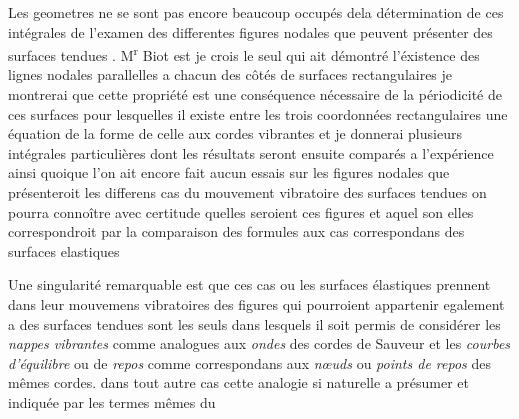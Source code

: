 \documentclass[11pt,a4paper]{article}
\begin{document}
Les geometres ne se sont pas encore beaucoup occupés dela détermination
de ces intégrales   de l'examen des differentes figures
nodales que peuvent présenter  des surfaces tendues . M\textsuperscript{r} Biot est je crois le seul qui ait démontré
l'éxistence des lignes nodales parallelles a chacun des côtés de  
surfaces rectangulaires 
je montrerai que cette propriété est une conséquence nécessaire de la
périodicité de ces surfaces pour lesquelles il existe entre les trois coordonnées
rectangulaires une équation de la forme de celle aux cordes vibrantes
et je donnerai plusieurs intégrales particulières dont les résultats
seront ensuite comparés a l'expérience  ainsi
quoique l'on ait encore fait aucun essais sur les figures nodales
que présenteroit les differens cas du mouvement vibratoire des
surfaces tendues on pourra connoître avec certitude quelles seroient
ces figures et aquel son elles correspondroit par la comparaison
des formules aux cas correspondans des surfaces elastiques

Une singularité remarquable est que ces cas ou les surfaces élastiques
prennent dans leur mouvemens vibratoires des figures qui 
pourroient appartenir egalement a des surfaces tendues sont les seuls
dans lesquels il soit permis de considérer les \emph{nappes vibrantes}
comme analogues aux \emph{ondes} des cordes de Sauveur et les \emph{courbes
d'équilibre} ou de \emph{repos} comme correspondans aux \emph{nœuds} ou
\emph{points de repos} des mêmes cordes. dans tout autre cas cette analogie
si naturelle a présumer et indiquée par les termes mêmes du
\end{document}

